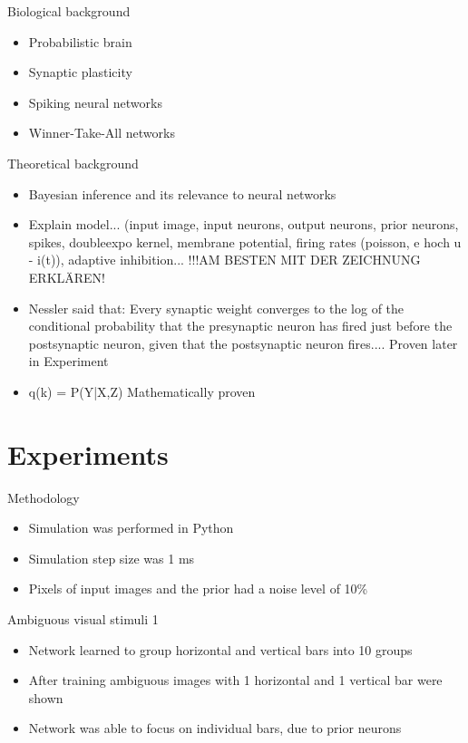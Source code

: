 \documentclass[aspectratio=169]{beamer}
\begin{document}
\begin{frame}{Biological background}
      \begin{itemize}
        \item Probabilistic brain
        \item Synaptic plasticity
        \item Spiking neural networks
        \item Winner-Take-All networks
      \end{itemize}
\end{frame}

\begin{frame}{Theoretical background}
      \begin{itemize}
        \item Bayesian inference and its relevance to neural networks
        \item Explain model... (input image, input neurons, output neurons, prior neurons, spikes, doubleexpo kernel, membrane potential, firing rates (poisson, e hoch u - i(t)), adaptive inhibition... !!!AM BESTEN MIT DER ZEICHNUNG ERKLÄREN!
         \item Nessler said that: Every synaptic weight converges to the log of the conditional probability that the presynaptic neuron has fired just before the postsynaptic neuron, given that the postsynaptic neuron fires.... Proven later in Experiment
        \item q(k) = P(Y|X,Z) Mathematically proven  

      \end{itemize}
\end{frame}


\section{Experiments}

\begin{frame}{Methodology}
\begin{itemize}
	\item Simulation was performed in Python
	\item Simulation step size was 1 ms
	\item Pixels of input images and the prior had a noise level of 10\%
\end{itemize}
\end{frame}

\begin{frame}{Ambiguous visual stimuli 1}
  \begin{itemize}
    \item Network learned to group horizontal and vertical bars into 10 groups
    \item After training ambiguous images with 1 horizontal and 1 vertical bar were shown
    \item Network was able to focus on individual bars, due to prior neurons
  \end{itemize}
\end{frame}
\end{document}
